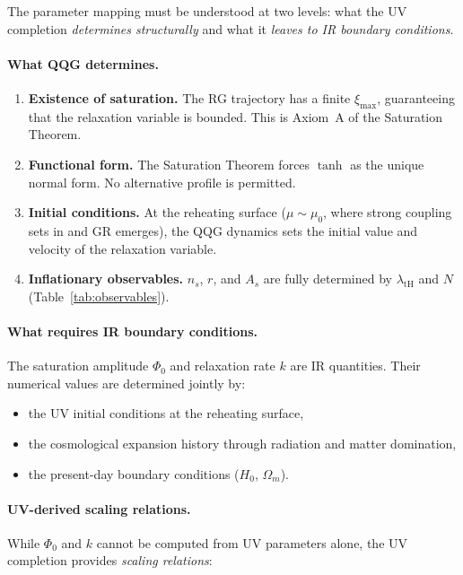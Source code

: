 \documentclass[aps,prd,twocolumn,superscriptaddress,nofootinbib]{revtex4-2}
\begin{document}
The parameter mapping must be understood at two levels: what the UV completion \textit{determines structurally} and what it \textit{leaves to IR boundary conditions}.

\paragraph{What QQG determines.}
\begin{enumerate}
\item \textbf{Existence of saturation.} The RG trajectory has a finite $\xi_\mathrm{max}$, guaranteeing that the relaxation variable is bounded. This is Axiom~A of the Saturation Theorem.
\item \textbf{Functional form.} The Saturation Theorem forces $\tanh$ as the unique normal form. No alternative profile is permitted.
\item \textbf{Initial conditions.} At the reheating surface ($\mu \sim \mu_0$, where strong coupling sets in and GR emerges), the QQG dynamics sets the initial value and velocity of the relaxation variable.
\item \textbf{Inflationary observables.} $n_s$, $r$, and $A_s$ are fully determined by $\lambda_\mathrm{tH}$ and $N$ (Table~\ref{tab:observables}).
\end{enumerate}

\paragraph{What requires IR boundary conditions.}
The saturation amplitude $\Phi_0$ and relaxation rate $k$ are IR quantities. Their numerical values are determined jointly by:
\begin{itemize}
\item the UV initial conditions at the reheating surface,
\item the cosmological expansion history through radiation and matter domination,
\item the present-day boundary conditions ($H_0$, $\Omega_m$).
\end{itemize}

\paragraph{UV-derived scaling relations.}
While $\Phi_0$ and $k$ cannot be computed from UV parameters alone, the UV completion provides \textit{scaling relations}:
\end{document}
